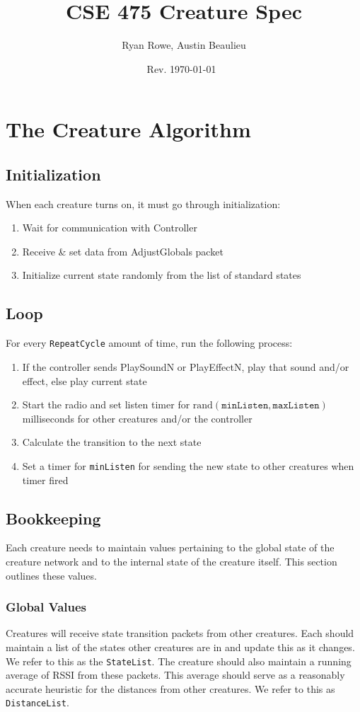 \documentclass{article}
\title{CSE 475 Creature Spec}
\author{Ryan Rowe, Austin Beaulieu}
\date{Rev. \today~\DTMcurrenttime}
\newcommand{\code}{\texttt}
\newcommand{\rand}{\text{rand}}
\begin{document}
\maketitle

\section{The Creature Algorithm}

\subsection{Initialization}
When each creature turns on, it must go through initialization:

\begin{enumerate}
    \item Wait for communication with Controller
    \item Receive \& set data from AdjustGlobals packet
    \item Initialize current state randomly from the list of standard states
\end{enumerate}

\subsection{Loop}
For every \code{RepeatCycle} amount of time, run the following process:
\begin{enumerate}
    \item If the controller sends PlaySoundN or PlayEffectN, play that sound and/or effect, else play current state
    \item Start the radio and set listen timer for $\rand(\code{minListen}, \code{maxListen})$ milliseconds for other creatures and/or the controller
    \item Calculate the transition to the next state
    \item Set a timer for \code{minListen} for sending the new state to other creatures when timer fired
\end{enumerate}


\subsection{Bookkeeping}
Each creature needs to maintain values pertaining to the global state of the creature network and to the internal state of the creature itself. This section outlines these values.

\subsubsection{Global Values}
Creatures will receive state transition packets from other creatures. Each should maintain a list of the states other creatures are in and update this as it changes. We refer to this as the \code{StateList}. The creature should also maintain a running average of RSSI from these packets. This average should serve as a reasonably accurate heuristic for the distances from other creatures. We refer to this as \code{DistanceList}.
\end{document}
